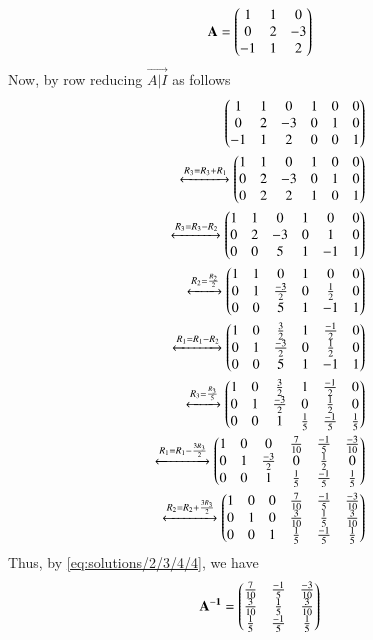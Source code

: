 \begin{align}
\mathbf{A} = \begin{pmatrix}1 & 1 &  0 \\ 0 & 2 & -3  \\ -1 & 1 & 2 \end{pmatrix}
\end{align}
Now, by row reducing $\vec{A|I}$ as follows 
\begin{align}
\begin{pmatrix}1 & 1 & 0 & 1& 0 &0  \\ 0 & 2 & -3 & 0& 1&0 \\ -1 & 1 & 2& 0& 0 &1\end{pmatrix}\\ \xleftrightarrow[]{R_3=R_3+R_1}\begin{pmatrix}1 & 1 & 0 & 1& 0 &0  \\ 0 & 2 & -3 & 0& 1&0 \\ 0 & 2 & 2& 1& 0 &1\end{pmatrix}\\
\xleftrightarrow[]{R_3=R_3-R_2}\begin{pmatrix}1 & 1 & 0 & 1& 0 &0  \\ 0 & 2 & -3 & 0& 1&0 \\ 0 & 0 & 5& 1& -1 &1\end{pmatrix}\\
\xleftrightarrow[]{R_2=\frac{R_2}{2}}\begin{pmatrix}1 & 1 & 0 & 1& 0 &0  \\ 0 & 1 & \frac{-3}{2} & 0& \frac{1}{2}&0 \\ 0 & 0 & 5& 1& -1 &1\end{pmatrix}\\
\xleftrightarrow[]{R_1=R_1-R_2}\begin{pmatrix}1 & 0 & \frac{3}{2} & 1& \frac{-1}{2} &0  \\ 0 & 1 & \frac{-3}{2} & 0& \frac{1}{2}&0 \\ 0 & 0 & 5& 1& -1 &1\end{pmatrix}\\
\xleftrightarrow[]{R_3=\frac{R_3}{5}}\begin{pmatrix}1 & 0 & \frac{3}{2} & 1& \frac{-1}{2} &0  \\ 0 & 1 & \frac{-3}{2} & 0& \frac{1}{2}&0 \\ 0 & 0 & 1& \frac{1}{5}& \frac{-1}{5} &\frac{1}{5}\end{pmatrix}\\
\xleftrightarrow[]{R_1=R_1-\frac{3R_3}{2}}\begin{pmatrix}1 & 0 & 0 & \frac{7}{10}& \frac{-1}{5} &\frac{-3}{10} \\ 0 & 1 & \frac{-3}{2} & 0& \frac{1}{2}&0 \\ 0 & 0 & 1& \frac{1}{5}& \frac{-1}{5} &\frac{1}{5}\end{pmatrix}\\
\xleftrightarrow[]{R_2=R_2+\frac{3R_3}{2}}\begin{pmatrix}1 & 0 & 0 & \frac{7}{10}& \frac{-1}{5} &\frac{-3}{10} \\ 0 & 1 & 0 & \frac{3}{10}& \frac{1}{5}&\frac{3}{10} \\ 0 & 0 & 1& \frac{1}{5}& \frac{-1}{5} &\frac{1}{5}\end{pmatrix}	\label{eq:solutions/2/3/4/4}
\end{align}
Thus, by \eqref{eq:solutions/2/3/4/4}, we have
\begin{align}
	\mathbf{A^{-1}}= \begin{pmatrix} \frac{7}{10}& \frac{-1}{5} &\frac{-3}{10} \\ \frac{3}{10}& \frac{1}{5}&\frac{3}{10} \\  \frac{1}{5}& \frac{-1}{5} &\frac{1}{5}\end{pmatrix}
\end{align}
